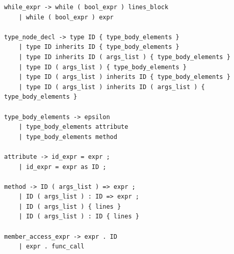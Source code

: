\documentclass{article}
\begin{document}
\begin{verbatim}
while_expr -> while ( bool_expr ) lines_block
    | while ( bool_expr ) expr

type_node_decl -> type ID { type_body_elements }
    | type ID inherits ID { type_body_elements }
    | type ID inherits ID ( args_list ) { type_body_elements }
    | type ID ( args_list ) { type_body_elements }
    | type ID ( args_list ) inherits ID { type_body_elements }
    | type ID ( args_list ) inherits ID ( args_list ) { type_body_elements }

type_body_elements -> epsilon
    | type_body_elements attribute
    | type_body_elements method

attribute -> id_expr = expr ;
    | id_expr = expr as ID ;

method -> ID ( args_list ) => expr ;
    | ID ( args_list ) : ID => expr ;
    | ID ( args_list ) { lines }
    | ID ( args_list ) : ID { lines }

member_access_expr -> expr . ID
    | expr . func_call
\end{verbatim}
\end{document}
